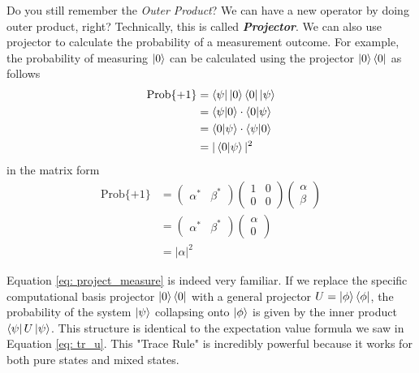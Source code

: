 \documentclass[11pt, letterpaper]{article}
\begin{document}
Do you still remember the \textit{Outer Product}? We can have a new operator by doing outer product, right? Technically, this is called \textbf{\textit{Projector}}. We can also use projector to calculate the probability of a measurement outcome. For example, the probability of measuring $\ket{0}$ can be calculated using the projector $\ket{0}\bra{0}$ as follows
\begin{equation}
  \begin{aligned}
    \text{Prob}\{+1\}  &= \bra{\psi} \ket{0}\bra{0} \ket{\psi} \\
    &= \braket{\psi | 0} \cdot \braket{0 | \psi} \\
    &= \braket{0|\psi} \cdot \braket{\psi|0} \\
    &= |\braket{0|\psi}|^2
  \end{aligned}
  \label{eq: project_measure}
\end{equation}
in the matrix form
\begin{equation}
  \begin{aligned}
    \text{Prob}\{+1\}  &= \begin{pmatrix} \alpha^* & \beta^* \end{pmatrix} \begin{pmatrix} 1 & 0 \\ 0 & 0 \end{pmatrix} \begin{pmatrix} \alpha \\ \beta \end{pmatrix} \\
    &= \begin{pmatrix} \alpha^* & \beta^* \end{pmatrix} \begin{pmatrix} \alpha \\ 0 \end{pmatrix} \\
    &= |\alpha|^2
  \end{aligned}
\end{equation}

Equation \ref{eq: project_measure} is indeed very familiar. If we replace the specific computational basis projector $\ket{0}\bra{0}$ with a general projector $U = \ket{\phi}\bra{\phi}$, the probability of the system $\ket{\psi}$ collapsing onto $\ket{\phi}$ is given by the inner product $\bra{\psi} U \ket{\psi}$. This structure is identical to the expectation value formula we saw in Equation \ref{eq: tr_u}. This "Trace Rule" is incredibly powerful because it works for both pure states and mixed states.
\end{document}
